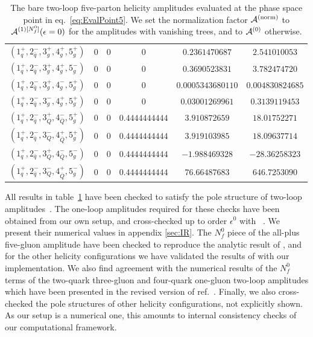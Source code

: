 \begin{table}[!htbp]
\begin{adjustbox}{width=1\textwidth}
\begin{tabular}{cccccc}
      \midrule
      $( 1_q^+, 2_{\bar q}^-, 3_g^+, 4_g^+, 5_g^+ )$ & 0 & 0 & 0 & $0.2361470687$ & $2.541010053$ \\
      $( 1_q^+, 2_{\bar q}^-, 3_g^+, 4_g^+, 5_g^- )$ & 0 & 0 & 0 & $0.3690523831$ & $3.782474720$ \\
      $( 1_q^+, 2_{\bar q}^-, 3_g^+, 4_g^-, 5_g^+ )$ & 0 & 0 & 0 & $0.0005343680110$ & $0.004830824685$ \\
      $( 1_q^+, 2_{\bar q}^-, 3_g^-, 4_g^+, 5_g^+ )$ & 0 & 0 & 0 & $0.03001269961$ & $0.3139119453$ \\
      \midrule
      $( 1_q^+, 2_{\bar q}^-, 3_Q^+, 4_{\bar Q}^-, 5_g^+ )$ & 0 & 0 & $0.4444444444$ & $3.910872659$ & $18.01752271$ \\
      $( 1_q^+, 2_{\bar q}^-, 3_Q^-, 4_{\bar Q}^+, 5_g^+ )$ & 0 & 0 & $0.4444444444$ & $3.919103985$ & $18.09637714$ \\
      $( 1_q^+, 2_{\bar q}^-, 3_Q^+, 4_{\bar Q}^-, 5_g^- )$ & 0 & 0 & $0.4444444444$ & $-1.988469328$ & $-28.36258323$ \\
      $( 1_q^+, 2_{\bar q}^-, 3_Q^-, 4_{\bar Q}^+, 5_g^- )$ & 0 & 0 & $0.4444444444$ & $76.66487683$ & $646.7253090$ \\
      \bottomrule
    \end{tabular}
  \end{adjustbox}
  \caption{The bare two-loop five-parton helicity amplitudes evaluated
    at the phase space point in eq.~\eqref{eq:EvalPoint5}. We set the
    normalization factor $\mathcal{A}^\mathrm{(norm)}$ to $\mathcal{A}^{(1)[N_f^0]}(\epsilon=0)$ for the
    amplitudes with vanishing trees, and to $\mathcal{A}^{(0)}$ otherwise.} 
  \label{tab:results5parton}
\end{table}

All results in table~\ref{tab:results5parton} have been 
checked to satisfy the pole structure of two-loop
amplitudes~\cite{Catani:1998bh}. 
The one-loop amplitudes required for these checks
have been obtained from our own setup,
and cross-checked up to order $\epsilon^0$ 
with \BlackHat{}~\cite{Berger:2008sj}. We present their 
numerical values in appendix \ref{sec:IR}.
The $N_f^0$ piece of the all-plus five-gluon amplitude have been
checked to reproduce the analytic result
of \cite{Gehrmann:2015bfy}, and for the other helicity 
configurations we have validated the results of
\cite{Badger:2017jhb} with our implementation.
We also find agreement with the numerical results of the $N_f^0$ terms
of the two-quark three-gluon and four-quark one-gluon two-loop
amplitudes which have been presented in the revised version of
ref.~\cite{Badger:2018gip}.
Finally, we also cross-checked the pole structures of other 
helicity configurations, not explicitly shown. As our setup is a
numerical one, this amounts to internal consistency checks of 
our computational framework.


